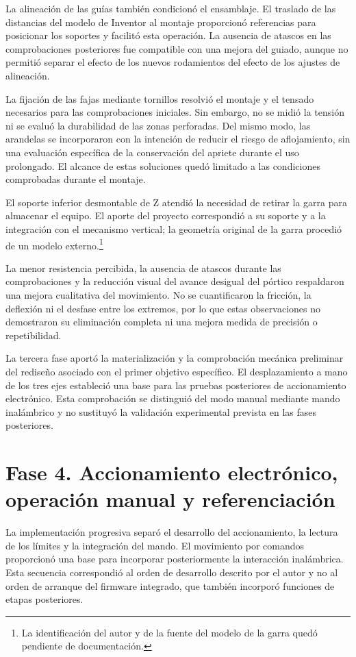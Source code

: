La alineación de las guías también condicionó el ensamblaje. El traslado de las distancias del modelo de Inventor al montaje proporcionó referencias para posicionar los soportes y facilitó esta operación. La ausencia de atascos en las comprobaciones posteriores fue compatible con una mejora del guiado, aunque no permitió separar el efecto de los nuevos rodamientos del efecto de los ajustes de alineación.

La fijación de las fajas mediante tornillos resolvió el montaje y el tensado necesarios para las comprobaciones iniciales. Sin embargo, no se midió la tensión ni se evaluó la durabilidad de las zonas perforadas. Del mismo modo, las arandelas se incorporaron con la intención de reducir el riesgo de aflojamiento, sin una evaluación específica de la conservación del apriete durante el uso prolongado. El alcance de estas soluciones quedó limitado a las condiciones comprobadas durante el montaje.

El soporte inferior desmontable de Z atendió la necesidad de retirar la garra para almacenar el equipo. El aporte del proyecto correspondió a su soporte y a la integración con el mecanismo vertical; la geometría original de la garra procedió de un modelo externo.\footnote{La identificación del autor y de la fuente del modelo de la garra quedó pendiente de documentación.}

La menor resistencia percibida, la ausencia de atascos durante las comprobaciones y la reducción visual del avance desigual del pórtico respaldaron una mejora cualitativa del movimiento. No se cuantificaron la fricción, la deflexión ni el desfase entre los extremos, por lo que estas observaciones no demostraron su eliminación completa ni una mejora medida de precisión o repetibilidad.

La tercera fase aportó la materialización y la comprobación mecánica preliminar del rediseño asociado con el primer objetivo específico. El desplazamiento a mano de los tres ejes estableció una base para las pruebas posteriores de accionamiento electrónico. Esta comprobación se distinguió del modo manual mediante mando inalámbrico y no sustituyó la validación experimental prevista en las fases posteriores.

\section{Fase 4. Accionamiento electrónico, operación manual y referenciación}
\label{sec:discusion_fase4}

La implementación progresiva separó el desarrollo del accionamiento, la lectura de los límites y la integración del mando. El movimiento por comandos proporcionó una base para incorporar posteriormente la interacción inalámbrica. Esta secuencia correspondió al orden de desarrollo descrito por el autor y no al orden de arranque del firmware integrado, que también incorporó funciones de etapas posteriores.

